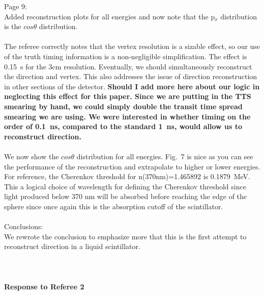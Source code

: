 \documentclass[11pt]{article}
\begin{document}
\noindent
Page 9: \\
Added reconstruction plots for all energies and now note that the p$_x$ distribution is the $cos\theta$ distribution. \\ \\
The referee correctly notes that the vertex resolution is a sizable effect, so our use of the truth timing information is a non-negligible simplification. The effect is 0.15~s for the 3cm resolution. Eventually, we should simultaneously reconstruct the direction and vertex. This also addresses the issue of direction reconstruction in other sections of the detector. {\bf Should I add more here about our logic in neglecting this effect for this paper.  Since we are putting in the TTS smearing by hand,  we could simply double the transit time spread smearing we are using. We were interested in whether timing on the order of 0.1~ns, compared to the standard 1~ns, would allow us to reconstruct direction.}\\ \\
We now show the $cos\theta$ distribution for all energies. Fig.~7  is nice as you can see the performance of the reconstruction and extrapolate to higher or lower energies. For reference,  the Cherenkov threshold for  n(370nm)=1.465892 is 0.1879~MeV. This a logical choice of wavelength for defining the Cherenkov threshold since light produced below 370 nm will be absorbed before reaching the edge of the sphere since once again this is the absorption cutoff of the scintillator. \\ \\ 

\noindent
Conclusions:\\
We rewrote the conclusion to emphasize more that this is the first attempt to reconstruct direction in a liquid scintillator. \\ \\ \\ \\ 

\noindent
{\bf Response to Referee 2}\\
\end{document}
